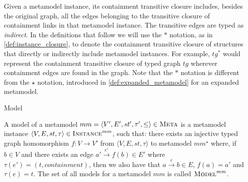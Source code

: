 Given a metamodel instance, its containment transitive closure includes, besides the original graph, all the edges belonging to the transitive closure of containment links in that metamodel instance. The transitive edges are typed as \emph{indirect}. In the definitions that follow we will use the $*$ notation, as in \cref{def:instance_closure}, to denote the containment transitive closure of structures that directly or indirectly include metamodel instances. For example, $tg^{*}$ would represent the containment transitive closure of typed graph $tg$ wherever containment edges are found in the graph. Note that the $*$ notation is different from the $\star$ notation, introduced in \cref{def:expanded_metamodel} for an expanded metamodel. 




\begin{definition}{Model\\}
\label{def:model}

A model of a  metamodel $mm = \langle V',E',st',\tau',\leq\rangle\in \textsc{Meta}$ is a metamodel instance $\langle V,E,st,\tau\rangle\in \textsc{Instance}^{mm}$, such that: there exists an injective typed graph homomorphism $f:V\rightarrow V'$ from $\langle V,E,st,\tau\rangle$ to metamodel $mm^{\star}$ where, if $b\in V$ and there exists an edge $a'\xrightarrow{e'} f(b)\in E'$ where $\tau(e') = (t,containment)$, then we also have that $a\xrightarrow{e} b\in E$, $f(a) = a'$ and $\tau(e)=t$. The set of all models for a metamodel $mm$ is called $\textsc{Model}^{mm}$.

\end{definition}




